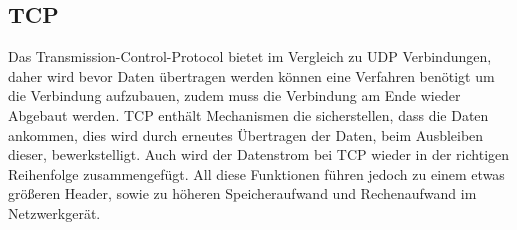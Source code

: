 \documentclass[a4paper,14pt,headsepline]{scrartcl}
\begin{document}
\subsection{TCP}
Das Transmission-Control-Protocol bietet im Vergleich zu UDP Verbindungen, daher wird bevor Daten übertragen werden können eine Verfahren benötigt um die Verbindung aufzubauen, zudem muss die Verbindung am Ende wieder Abgebaut werden. TCP enthält Mechanismen die sicherstellen, dass die Daten ankommen, dies wird durch erneutes Übertragen der Daten, beim Ausbleiben dieser, bewerkstelligt. Auch wird der Datenstrom bei TCP wieder in der richtigen Reihenfolge zusammengefügt. All diese Funktionen führen jedoch zu einem etwas größeren Header, sowie zu höheren Speicheraufwand und Rechenaufwand im Netzwerkgerät.
\begin{figure}[h]
\begin{center}
\end{center}
\end{figure}
\end{document}
